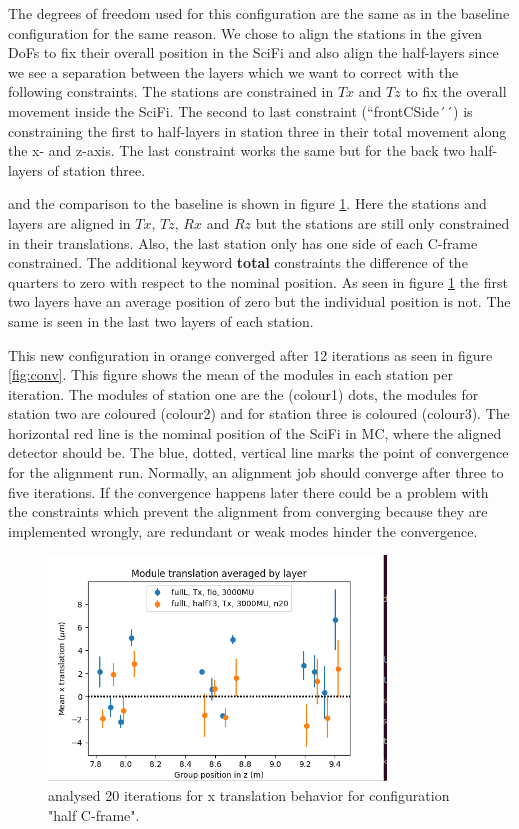 The degrees of freedom used for this configuration are the same as in the baseline configuration for the same reason.
We chose to align the stations in the given DoFs to fix their overall position in the SciFi and also align the half-layers since we see a separation between the layers which we want to correct with the following constraints.
The stations are constrained in $Tx$ and $Tz$ to fix the overall movement inside the SciFi. The second to last constraint (``frontCSide´´) is constraining the first to half-layers in station three in their total movement along the x- and z-axis.
The last constraint works the same but for the back two half-layers of station three.

and the comparison to the baseline is shown in figure \ref{fig:june_3}.
Here the stations and layers are aligned in $Tx$, $Tz$, $Rx$ and $Rz$ but the stations are still only constrained in their translations. Also, the last station only has one side of each C-frame constrained. The additional keyword \textbf{total} constraints
the difference of the quarters to zero with respect to the nominal position. As seen in figure \ref{fig:june_3} the first two layers have an average position of zero but the individual position is not. The same is seen in the last two layers of each station.

This new configuration in orange converged after 12 iterations as seen in figure \ref{fig:conv}.
This figure shows the mean of the modules in each station per iteration. The modules of station one are the (colour1) dots, the modules for station two are coloured (colour2) and for station three is coloured (colour3).
The horizontal red line is the nominal position of the SciFi in MC, where the aligned detector should be.
The blue, dotted, vertical line marks the point of convergence for the alignment run.
Normally, an alignment job should converge after three to five iterations. If the convergence happens later there could be a problem with the constraints which prevent the alignment from converging because they are implemented wrongly, are redundant or weak modes hinder the convergence.

\begin{figure}
  \centering
  \includegraphics[width=0.8\textwidth]{plots/june_21/allT_halfT3_n20_Tx.png}
  \caption{analysed 20 iterations for x translation behavior for configuration "half C-frame".}
  \label{fig:june_3}
\end{figure}

